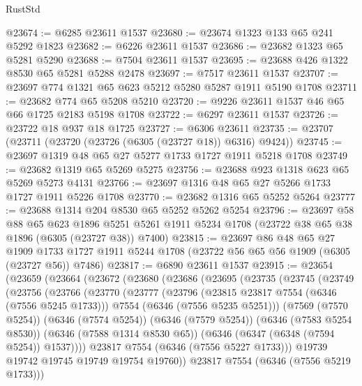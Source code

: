 \begin{lexlean}{RustStd}
\begin{coremodule}
@23674 := @6285 @23611 @1537
@23680 := @23674 @1323 @133 @65 @241 @5292 @1823
@23682 := @6226 @23611 @1537
@23686 := @23682 @1323 @65 @5281 @5290
@23688 := @7504 @23611 @1537
@23695 := @23688 @426 @1322 @8530 @65 @5281 @5288 @2478
@23697 := @7517 @23611 @1537
@23707 := @23697 @774 @1321 @65 @623 @5212 @5280 @5287 @1911 @5190 @1708
@23711 := @23682 @774 @65 @5208 @5210
@23720 := @9226 @23611 @1537 @46 @65 @66 @1725 @2183 @5198 @1708
@23722 := @6297 @23611 @1537
@23726 := @23722 @18 @937 @18 @1725
@23727 := @6306 @23611
@23735 := @23707 (@23711 (@23720 (@23726 (@6305 (@23727 @18)) @6316) @9424))
@23745 := @23697 @1319 @48 @65 @27 @5277 @1733 @1727 @1911 @5218 @1708
@23749 := @23682 @1319 @65 @5269 @5275
@23756 := @23688 @923 @1318 @623 @65 @5269 @5273 @4131
@23766 := @23697 @1316 @48 @65 @27 @5266 @1733 @1727 @1911 @5226 @1708
@23770 := @23682 @1316 @65 @5252 @5264
@23777 := @23688 @1314 @204 @8530 @65 @5252 @5262 @5254
@23796 := @23697
    @58
    @88
    @65
    @623
    @1896
    @5251
    @5261
    @1911
    @5234
    @1708
    (@23722 @38 @65 @38 @1896 (@6305 (@23727 @38)) @7400)
@23815 := @23697
    @86
    @48
    @65
    @27
    @1909
    @1733
    @1727
    @1911
    @5244
    @1708
    (@23722 @56 @65 @56 @1909 (@6305 (@23727 @56)) @7486)
@23817 := @6890 @23611 @1537
@23915 := @23654
    (@23659
      (@23664
        (@23672
          (@23680
            (@23686
              (@23695
                (@23735
                  (@23745
                    (@23749
                      (@23756
                        (@23766
                          (@23770
                            (@23777
                              (@23796
                                (@23815 @23817 @7554 (@6346 (@7556 @5245 @1733)))
                                @7554
                                (@6346 (@7556 @5235 @5251)))
                              (@7569 (@7570 @5254))
                              (@6346 (@7574 @5254))
                              (@6346 (@7579 @5254))
                              (@6346 (@7583 @5254 @8530))
                              (@6346 (@7588 @1314 @8530 @65))
                              (@6346 (@6347 (@6348 (@7594 @5254)) @1537))))
                          @23817
                          @7554
                          (@6346 (@7556 @5227 @1733)))
                        @19739
                        @19742
                        @19745
                        @19749
                        @19754
                        @19760))
                    @23817
                    @7554
                    (@6346 (@7556 @5219 @1733)))

\end{coremodule}
\end{lexlean}

